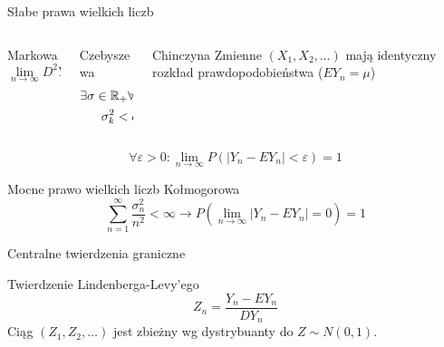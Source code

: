 \documentclass{mp}
\begin{document}
\begin{frame}{Słabe prawa wielkich liczb}
\begin{columns}[T]
\begin{column}{.30\textwidth}
{
\begin{block}{Markowa}
\[\lim_{n\to\infty} D^2Y_n=0 \]
\end{block}
}
\end{column}
\begin{column}{.30\textwidth}
{
\begin{block}{Czebyszewa}
\begin{gather*}
\exists \sigma\in\mathbb{R}_{+}\forall k\in\mathbb{N} \\
\sigma_k^2<\sigma^2
\end{gather*}
\end{block}
}
\end{column}
\begin{column}{.30\textwidth}
{
\begin{block}{Chinczyna}
Zmienne $(X_1, X_2, \ldots)$ mają identyczny rozkład prawdopodobieństwa
($EY_n=\mu$)
\end{block}
}
\end{column}
\end{columns}
\begin{block}{}
\[ \forall \varepsilon>0\colon \lim_{n\to\infty} P(\left|Y_n-EY_n\right|<\varepsilon)=1 \]
\end{block}
\end{frame}
\begin{frame}{Mocne prawo wielkich liczb Kołmogorowa}
\[ \sum_{n=1}^\infty \frac{\sigma_n^2}{n^2}<\infty \to P(\lim_{n\to\infty} \left|Y_n-EY_n\right|=0)=1 \]
\end{frame}
\begin{frame}{Centralne twierdzenia graniczne}
\begin{block}{Twierdzenie Lindenberga-Levy'ego}
\[ Z_n=\frac{Y_n-EY_n}{DY_n} \]
Ciąg $(Z_1,Z_2,\ldots)$ jest zbieżny wg dystrybuanty do $Z\sim N(0,1)$.
\end{block}
\end{frame}
\end{document}
